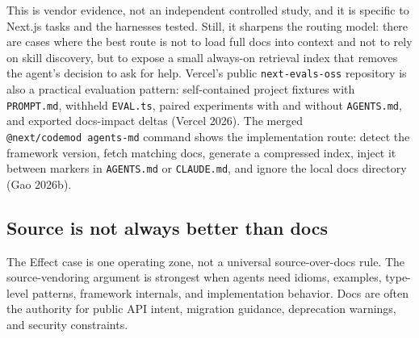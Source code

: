 \documentclass[
  11pt,
  letterpaper,
  numbers=noendperiod,
  parskip=half]{scrartcl}
\begin{document}
\figureVercelEval

This is vendor evidence, not an independent controlled study, and it is
specific to Next.js tasks and the harnesses tested. Still, it sharpens
the routing model: there are cases where the best route is not to load
full docs into context and not to rely on skill discovery, but to expose
a small always-on retrieval index that removes the agent's decision to
ask for help. Vercel's public \texttt{next-evals-oss} repository is also
a practical evaluation pattern: self-contained project fixtures with
\texttt{PROMPT.md}, withheld \texttt{EVAL.ts}, paired experiments with
and without \texttt{AGENTS.md}, and exported docs-impact deltas (Vercel
2026). The merged \texttt{@next/codemod\ agents-md} command shows the
implementation route: detect the framework version, fetch matching docs,
generate a compressed index, inject it between markers in
\texttt{AGENTS.md} or \texttt{CLAUDE.md}, and ignore the local docs
directory (Gao 2026b).

\subsection{Source is not always better than
docs}\label{sec-source-docs}

The Effect case is one operating zone, not a universal source-over-docs
rule. The source-vendoring argument is strongest when agents need
idioms, examples, type-level patterns, framework internals, and
implementation behavior. Docs are often the authority for public API
intent, migration guidance, deprecation warnings, and security
constraints.
\end{document}
